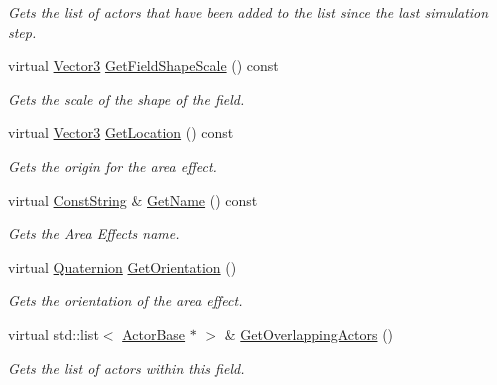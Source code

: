 \begin{DoxyCompactItemize}
\begin{DoxyCompactList}\small\item\em Gets the list of actors that have been added to the list since the last simulation step. \item\end{DoxyCompactList}\item 
virtual \hyperlink{classphys_1_1Vector3}{Vector3} \hyperlink{classphys_1_1AreaEffect_a4157e5e4142cbc3f0908942b4271b9b7}{GetFieldShapeScale} () const 
\begin{DoxyCompactList}\small\item\em Gets the scale of the shape of the field. \item\end{DoxyCompactList}\item 
virtual \hyperlink{classphys_1_1Vector3}{Vector3} \hyperlink{classphys_1_1AreaEffect_ac3ca23ffdcec077d0e7f36a471602b88}{GetLocation} () const 
\begin{DoxyCompactList}\small\item\em Gets the origin for the area effect. \item\end{DoxyCompactList}\item 
virtual \hyperlink{namespacephys_a5ce5049f8b4bf88d6413c47b504ebb31}{ConstString} \& \hyperlink{classphys_1_1AreaEffect_ac61255fb998e6d76ba6678f70796174d}{GetName} () const 
\begin{DoxyCompactList}\small\item\em Gets the Area Effects name. \item\end{DoxyCompactList}\item 
virtual \hyperlink{classphys_1_1Quaternion}{Quaternion} \hyperlink{classphys_1_1AreaEffect_a48946a43238686044cb4101a218102d6}{GetOrientation} ()
\begin{DoxyCompactList}\small\item\em Gets the orientation of the area effect. \item\end{DoxyCompactList}\item 
virtual std::list$<$ \hyperlink{classphys_1_1ActorBase}{ActorBase} $\ast$ $>$ \& \hyperlink{classphys_1_1AreaEffect_ab995fec11d9e5fbae1851109067958db}{GetOverlappingActors} ()
\begin{DoxyCompactList}\small\item\em Gets the list of actors within this field. \item\end{DoxyCompactList}\item 

\end{DoxyCompactItemize}
